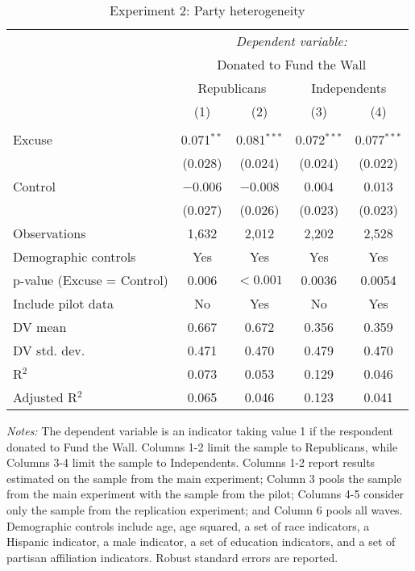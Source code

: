 
\begin{table}[!htbp] \centering 
  \caption{Experiment 2: Party heterogeneity} 
  \label{t:2-partyheterogeneity} 
\begin{threeparttable}
\begin{tabular}{@{\hspace{5pt}}l@{\hspace{5pt}}cccc} 
\toprule 
 & \multicolumn{4}{c}{\textit{Dependent variable:}} \\ 
\cmidrule(rr){2-5} 
 & \multicolumn{4}{c}{Donated to Fund the Wall} \\ 
 \cmidrule(rr){2-5}
 & \multicolumn{2}{c}{Republicans} & \multicolumn{2}{c}{Independents} \\ 
 & (1) & (2) & (3) & (4)\\ 
\midrule  
\\[-2.1ex] Excuse & 0.071$^{**}$ & 0.081$^{***}$ & 0.072$^{***}$ & 0.077$^{***}$ \\ 
  & (0.028) & (0.024) & (0.024) & (0.022) \\ 
 \addlinespace 
 Control & $-$0.006 & $-$0.008 & 0.004 & 0.013 \\ 
  & (0.027) & (0.026) & (0.023) & (0.023) \\ 
 \addlinespace 
Observations & 1,632 & 2,012 & 2,202 & 2,528 \\ 
\midrule  
Demographic controls & Yes & Yes & Yes & Yes \\ 
p-value (Excuse = Control) & 0.006 & $<0.001$ & 0.0036 & 0.0054 \\ 
\midrule
Include pilot data & No & Yes & No & Yes \\
\addlinespace
DV mean & 0.667 & 0.672 & 0.356 & 0.359 \\
DV std. dev. & 0.471 & 0.470 & 0.479 & 0.470 \\
R$^{2}$ & 0.073 & 0.053 & 0.129 & 0.046 \\ 
Adjusted R$^{2}$ & 0.065 & 0.046 & 0.123 & 0.041 \\ 
\bottomrule 
\end{tabular} 
\begin{tablenotes}
\footnotesize
\item \textit{Notes:} The dependent variable is an indicator taking value 1 if the respondent donated to Fund the Wall. Columns 1-2 limit the sample to Republicans, while Columns 3-4 limit the sample to Independents. Columns 1-2 report results estimated on the sample from the main experiment; Column 3 pools the sample from the main experiment with the sample from the pilot; Columns 4-5 consider only the sample from the replication experiment; and Column 6 pools all waves. Demographic controls include age, age squared, a set of race indicators, a Hispanic indicator, a male indicator, a set of education indicators, and a set of partisan affiliation indicators. Robust standard errors are reported.
\end{tablenotes}
\end{threeparttable}
\end{table} 
